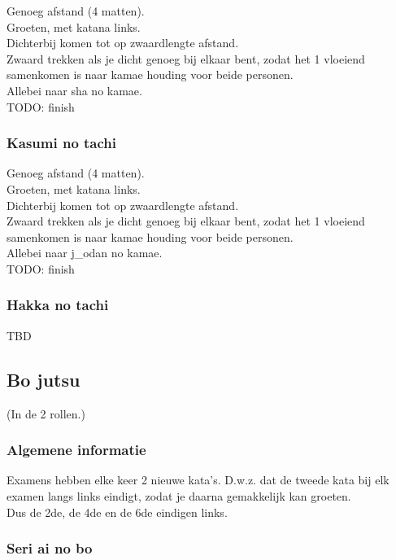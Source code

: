 Genoeg afstand (4 matten).\\
Groeten, met katana links.\\
Dichterbij komen tot op zwaardlengte afstand.\\
Zwaard trekken als je dicht genoeg bij elkaar bent, zodat het 1 vloeiend samenkomen is naar kamae houding voor beide personen.\\
Allebei naar sha no kamae.\\
TODO: finish

\subsubsection{Kasumi no tachi}

Genoeg afstand (4 matten).\\
Groeten, met katana links.\\
Dichterbij komen tot op zwaardlengte afstand.\\
Zwaard trekken als je dicht genoeg bij elkaar bent, zodat het 1 vloeiend samenkomen is naar kamae houding voor beide personen.\\
Allebei naar j\_{o}dan no kamae.\\
TODO: finish

\subsubsection{Hakka no tachi}

TBD

\subsection{Bo jutsu}
(In de 2 rollen.)

\subsubsection{Algemene informatie}

Examens hebben elke keer 2 nieuwe kata's. D.w.z. dat de tweede kata bij elk examen langs links eindigt, zodat je daarna gemakkelijk kan groeten.\\
Dus de 2de, de 4de en de 6de eindigen links.

\subsubsection{Seri ai no bo}

